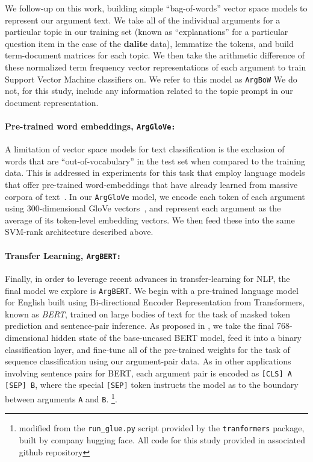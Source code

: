 \documentclass[runningheads]{llncs}
\begin{document}
We follow-up on this work, building simple ``bag-of-words'' vector space models 
to represent our argument text. 
We take all of the individual arguments for a particular topic in our training 
set (known as  ``explanations'' for a particular question item in the case of 
the \textbf{dalite} data), lemmatize the tokens, and build term-document 
matrices for each topic.
We then take the arithmetic difference of these normalized term frequency 
vector representations of each argument to train Support Vector Machine 
classifiers on. 
We refer to this model as \verb|ArgBoW| 
We do not, for this study, include any information related to the topic prompt 
in our document representation.


\paragraph{\textbf{Pre-trained word embeddings, \tt{ArgGloVe}:}}
A limitation of vector space models for text classification is the exclusion of 
words that are ``out-of-vocabulary'' in the test set when compared to the 
training data.
This is addressed in experiments for this task that employ language models that 
offer pre-trained word-embeddings that have already learned from massive 
corpora of text~\cite{habernal_which_2016}\cite{gleize_are_2019}.    
In our \verb|ArgGloVe| model, we encode each token of each argument using 
300-dimensional GloVe vectors~\cite{pennington_glove:_2014}, 
and represent each argument as the average of its token-level embedding 
vectors. 
We then feed these into the same SVM-rank architecture described above. 

\paragraph{\textbf{Transfer Learning, \tt{ArgBERT}:}}
Finally, in order to leverage recent advances in transfer-learning for NLP, the 
final model we explore is \verb|ArgBERT|.
We begin with a pre-trained language model for English built using  
Bi-directional Encoder Representation from Transformers, known as 
\textit{BERT}\cite{devlin_bert_2018}, trained on large bodies of text for the 
task of masked token prediction and sentence-pair inference. 
As proposed in \cite{toledo_automatic_2019}, we take the final 768-dimensional 
hidden state of the base-uncased BERT model, feed it into a binary 
classification layer, and fine-tune all of the pre-trained weights for the task 
of sequence classification using our argument-pair data. 
As in other applications involving sentence pairs for BERT, each argument pair 
is encoded as \verb|[CLS] A [SEP] B|, where the special \verb|[SEP]| token 
instructs the model as to the boundary between arguments \verb|A| and \verb|B|. 
\footnote{modified from the \verb|run_glue.py| 
script provided by the \verb|tranformers| package, built by company hugging 
face. All code for this study provided in associated github repository}.
\end{document}
